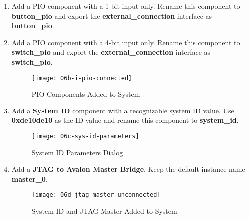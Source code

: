 \begin{flushleft}
\begin{enumerate}[
	label=\textbf{Step \arabic*.},
	leftmargin=*,
	widest={00},
	align=left]
\begin{enumerate}[
	label=\textbf{Step \arabic{enumi}\alph*.},
	leftmargin=*,
	align=left]
\begin{figure}[H]
\centering
\texttt{[image: 06b-pio-parameters]}
\caption{PIO Component Parameters Dialog}
\label{fig:06b-pio-parameters}
\end{figure}

\item Add a PIO component with a 1-bit input only. Rename this component to \textbf{button\_pio} and export the \textbf{external\_connection} interface as \textbf{button\_pio}.

\item Add a PIO component with a 4-bit input only. Rename this component to \textbf{switch\_pio} and export the \textbf{external\_connection} interface as \textbf{switch\_pio}.

\begin{figure}[H]
\centering
\texttt{[image: 06b-i-pio-connected]}
\caption{PIO Components Added to System}
\label{fig:06b-i-pio-connected}
\end{figure}

\item Add a \textbf{System ID} component with a recognizable system ID value. Use \textbf{0xde10de10} as the ID value and rename this component to \textbf{system\_id}.

\begin{figure}[H]
\centering
\texttt{[image: 06c-sys-id-parameters]}
\caption{System ID Parameters Dialog}
\label{fig:06c-sys-id-parameters}
\end{figure}

\newpage

\item Add a \textbf{JTAG to Avalon Master Bridge}.  Keep the default instance name \textbf{master\_0}.

\begin{figure}[H]
\centering
\texttt{[image: 06d-jtag-master-unconnected]}
\caption{System ID and JTAG Master Added to System}
\label{fig:06d-jtag-master-unconnected}
\end{figure}


\end{enumerate}
\end{enumerate}
\end{flushleft}
